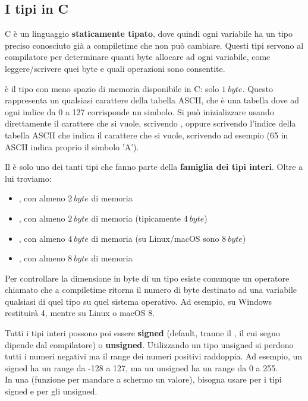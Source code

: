 \documentclass[11pt, a4paper, titlepage, oneside]{scrbook}
\begin{document}
\subsection{I tipi in C}

C è un linguaggio \textbf{staticamente tipato}, dove quindi ogni variabile ha un tipo preciso conosciuto già a compiletime che non può cambiare. Questi tipi servono al compilatore per determinare quanti byte allocare ad ogni variabile, come leggere/scrivere quei byte e quali operazioni sono consentite.

\begin{Definizione}
\label{def-char}
 è il tipo con meno spazio di memoria disponibile in C: solo $\SI{1}{byte}$. Questo rappresenta un qualsiasi carattere della tabella ASCII, che è una tabella dove ad ogni indice da 0 a 127 corrisponde un simbolo. Si può inizializzare usando direttamente il carattere che si vuole, scrivendo , oppure scrivendo l'indice della tabella ASCII che indica il carattere che si vuole, scrivendo ad esempio  (65 in ASCII indica proprio il simbolo 'A').
\end{Definizione}

\begin{Definizione}
\label{def-int}
Il  è solo uno dei tanti tipi che fanno parte della \textbf{famiglia dei tipi interi}. Oltre a lui troviamo:
\begin{itemize}
    \item {}, con almeno $\SI{2}{byte}$ di memoria
    \item {}, con almeno $\SI{2}{byte}$ di memoria (tipicamente $\SI{4}{byte}$)
    \item {}, con almeno $\SI{4}{byte}$ di memoria (su Linux/macOS sono $\SI{8}{byte}$)
    \item {}, con almeno $\SI{8}{byte}$ di memoria 
\end{itemize}
\end{Definizione}

Per controllare la dimensione in byte di un tipo esiste comunque un operatore chiamato  che a compiletime ritorna il numero di byte destinato ad una variabile qualsiasi di quel tipo su quel sistema operativo. Ad esempio,  su Windows restituirà 4, mentre su Linux o macOS 8.

\begin{Proprieta}
\label{prop-signed-unsigned}
Tutti i tipi interi possono poi essere \textbf{signed} (default, tranne il , il cui segno dipende dal compilatore) o \textbf{unsigned}. Utilizzando un tipo unsigned si perdono tutti i numeri negativi ma il range dei numeri positivi raddoppia. Ad esempio, un  signed ha un range da -128 a 127, ma un  unsigned ha un range da 0 a 255. \\
\NB In una  (funzione per mandare a schermo un valore), bisogna usare  per i tipi signed e  per gli unsigned.
\end{Proprieta}
\end{document}
